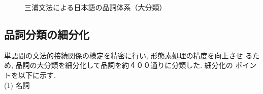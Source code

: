 \begin{figure}
\begin{center}
	
	
	
\end{center}
\caption{三浦文法による日本語の品詞体系（大分類）}


\label{fig:hinshi}
\end{figure}

\subsection{品詞分類の細分化}

 単語間の文法的接続関係の検定を精密に行い, 形態素処理の精度を向上させ
るため, 品詞の大分類を細分化して品詞を約４００通りに分類した. 細分化の
ポイントを以下に示す. \\
(1) 名詞

